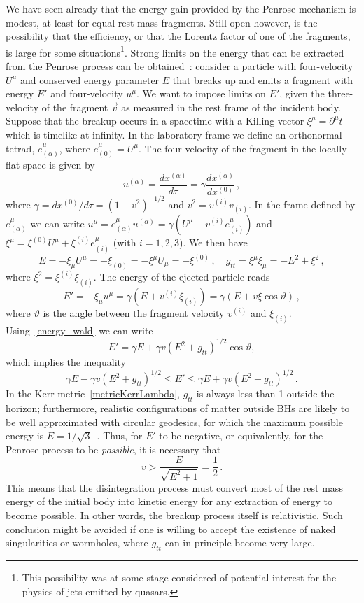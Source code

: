 \documentclass[11pt]{article}
\newcommand{\be}{\begin{equation}}
\newcommand{\ee}{\end{equation}}
\numberwithin{equation}{section} %
\begin{document}
We have seen already that the energy gain provided by the Penrose mechanism is modest, at least for equal-rest-mass fragments.
Still open however, is the possibility that the efficiency, or that the Lorentz factor of one of the fragments, is large
for some situations\footnote{This possibility was at some stage considered of potential interest for the physics of jets emitted by quasars.}.
Strong limits on the energy that can be extracted from the Penrose process can be obtained~\cite{Bardeen:1972fi,Wald:1974kya}:
consider a particle with four-velocity $U^{\mu}$ and conserved energy parameter $E$ that breaks up and emits a fragment with energy $E'$ and four-velocity $u^{\mu}$. We want to impose limits on $E'$, given the three-velocity of the fragment $\vec{v}$ as measured in the rest frame of the incident body.
Suppose that the breakup occurs in a spacetime with a Killing vector $\xi^{\mu}=\partial^{\mu} t$ which is timelike at infinity. In the laboratory frame we define an orthonormal tetrad, $e_{(\alpha)}^{\mu}$, where $e_{(0)}^{\mu}=U^{\mu}$. The four-velocity of the fragment in the locally flat space is given by
%
\be
u^{(\alpha)}=\frac{dx^{(\alpha)}}{d\tau}=\gamma \frac{dx^{(\alpha)}}{dx^{(0)}}\,,
\ee
%
where $\gamma=dx^{(0)}/d\tau=\left(1-v^2\right)^{-1/2}$ and $v^2=v^{(i)}v_{(i)}$. In the frame defined by $e_{(\alpha)}^{\mu}$ we can write $u^{\mu}=e_{(\alpha)}^{\mu}u^{(\alpha)}=\gamma(U^{\mu}+v^{(i)} e_{(i)}^{\mu})$ and $\xi^{\mu}=\xi^{(0)}U^{\mu}+\xi^{(i)}e_{(i)}^{\mu}$ (with $i=1,2,3$).
%
We then have
%
\be\label{energy_wald}
E=-\xi_{\mu}U^{\mu}=-\xi_{(0)}=-\xi^{\mu}U_{\mu}=-\xi^{(0)}\,, \quad g_{tt}=\xi^{\mu}\xi_{\mu}=-E^2+\xi^2\,,
\ee
% 
where $\xi^2=\xi^{(i)}\xi_{(i)}$. The energy of the ejected particle reads
%
\be
E'=-\xi_{\mu}u^{\mu}=\gamma\left(E+v^{(i)} \xi_{(i)}\right)=\gamma\left(E+v \xi\cos\vartheta\right)\,,
\ee
where $\vartheta$ is the angle between the fragment velocity $v^{(i)}$ and $\xi_{(i)}$.
%
Using~\eqref{energy_wald} we can write
%
\be
E'=\gamma E+\gamma v\left(E^2+g_{tt}\right)^{1/2}\cos\vartheta,
\ee
%
which implies the inequality
%
\be
\gamma E-\gamma v\left(E^2+g_{tt}\right)^{1/2} \leq E' \leq \gamma E+\gamma v\left(E^2+g_{tt}\right)^{1/2}\,. \label{Waldineq}
\ee
%
In the Kerr metric~\eqref{metricKerrLambda}, $g_{tt}$ is always less than 1 outside the horizon;
furthermore, realistic configurations of matter outside BHs are likely to be well approximated with circular geodesics, for which the maximum possible energy is $E=1/\sqrt{3}$~\cite{Bardeen:1972fi}. Thus, for $E'$ to be negative, or equivalently, for the Penrose process to be {\it possible}, it is necessary that
%
\be
v>\frac{E}{\sqrt{E^2+1}}=\frac{1}{2}\,.
\ee
%
This means that the disintegration process must convert most of the rest mass energy of the initial body into kinetic energy for any extraction of energy to become possible. In other words, the breakup process itself is relativistic. Such conclusion might be avoided if one is willing to accept the existence of naked singularities or wormholes, where $g_{tt}$ can in principle become very large.
\end{document}
